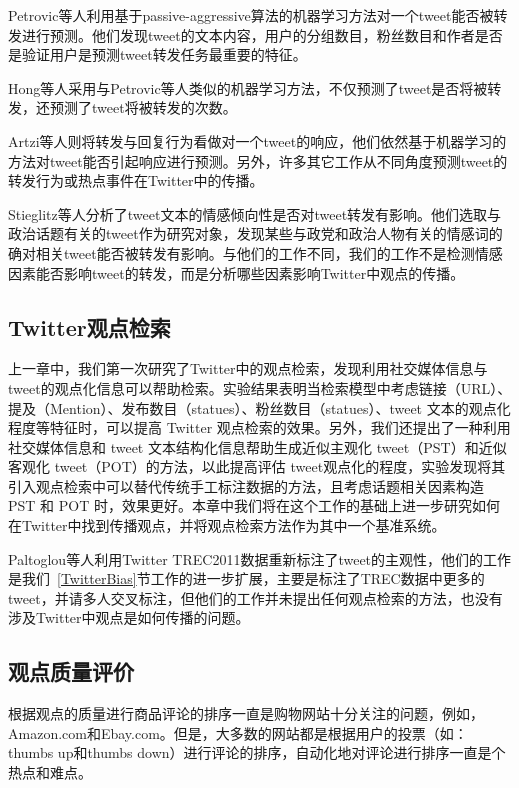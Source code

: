 Petrovic等人利用基于passive-aggressive算法的机器学习方法对一个tweet能否被转发进行预测。他们发现tweet的文本内容，用户的分组数目，粉丝数目和作者是否是验证用户是预测tweet转发任务最重要的特征。

Hong等人采用与Petrovic等人类似的机器学习方法，不仅预测了tweet是否将被转发，还预测了tweet将被转发的次数。

Artzi等人则将转发与回复行为看做对一个tweet的响应，他们依然基于机器学习的方法对tweet能否引起响应进行预测。另外，许多其它工作从不同角度预测tweet的转发行为或热点事件在Twitter中的传播。

Stieglitz等人分析了tweet文本的情感倾向性是否对tweet转发有影响。他们选取与政治话题有关的tweet作为研究对象，发现某些与政党和政治人物有关的情感词的确对相关tweet能否被转发有影响。与他们的工作不同，我们的工作不是检测情感因素能否影响tweet的转发，而是分析哪些因素影响Twitter中观点的传播。

\subsection{Twitter观点检索 }

上一章中，我们第一次研究了Twitter中的观点检索，发现利用社交媒体信息与tweet的观点化信息可以帮助检索。实验结果表明当检索模型中考虑链接（URL）、提及（Mention）、发布数目（statues）、粉丝数目（statues）、tweet 文本的观点化程度等特征时，可以提高 Twitter 观点检索的效果。另外，我们还提出了一种利用社交媒体信息和 tweet 文本结构化信息帮助生成近似主观化 tweet（PST）和近似客观化 tweet（POT）的方法，以此提高评估 tweet观点化的程度，实验发现将其引入观点检索中可以替代传统手工标注数据的方法，且考虑话题相关因素构造 PST 和 POT 时，效果更好。本章中我们将在这个工作的基础上进一步研究如何在Twitter中找到传播观点，并将观点检索方法作为其中一个基准系统。

Paltoglou等人利用Twitter TREC2011数据重新标注了tweet的主观性，他们的工作是我们~\ref{TwitterBias}节工作的进一步扩展，主要是标注了TREC数据中更多的tweet，并请多人交叉标注，但他们的工作并未提出任何观点检索的方法，也没有涉及Twitter中观点是如何传播的问题。

\subsection{观点质量评价}
根据观点的质量进行商品评论的排序一直是购物网站十分关注的问题，例如，Amazon.com和Ebay.com。但是，大多数的网站都是根据用户的投票（如：thumbs up和thumbs down）进行评论的排序，自动化地对评论进行排序一直是个热点和难点。

